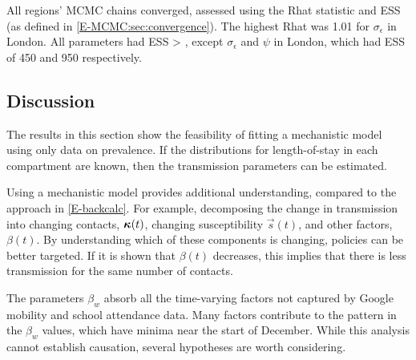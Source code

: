 \documentclass[thesis.tex]{subfiles}
\begin{document}
All regions' MCMC chains converged, assessed using the Rhat statistic and ESS (as defined in \cref{E-MCMC:sec:convergence}).
The highest Rhat was 1.01 for $\sigma_\epsilon$ in London.
All parameters had ESS > , except $\sigma_\epsilon$ and $\psi$ in London, which had ESS of 450 and 950 respectively.

\subsection{Discussion} \label{SEIR:sec:discussion}

The results in this section show the feasibility of fitting a mechanistic model using only data on prevalence.
If the distributions for length-of-stay in each compartment are known, then the transmission parameters can be estimated.

Using a mechanistic model provides additional understanding, compared to the approach in \cref{E-backcalc}.
For example, decomposing the change in transmission into changing contacts, $\bm{\kappa}(t)$, changing susceptibility $\vec{s}(t)$, and other factors, $\beta(t)$.
By understanding which of these components is changing, policies can be better targeted.
If it is shown that $\beta(t)$ decreases, this implies that there is less transmission for the same number of contacts.


The parameters $\beta_w$ absorb all the time-varying factors not captured by Google mobility and school attendance data.
Many factors contribute to the pattern in the $\beta_w$ values, which have minima near the start of December.
While this analysis cannot establish causation, several hypotheses are worth considering.
\end{document}
